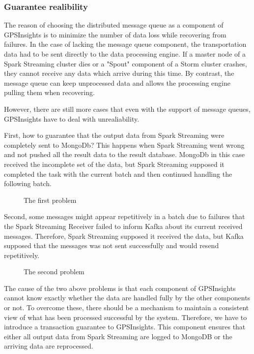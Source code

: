 \documentclass{acm_proc_article-sp}
\begin{document}
\subsubsection{Guarantee realibility}

The reason of choosing the distributed message queue as a component of GPSInsights is to minimize the number of data loss while recovering from failures. In the case of lacking the message queue component, the transportation data had to be sent directly to the data processing engine. If a master node of a Spark Streaming cluster dies or a "Spout" component of a Storm cluster crashes, they cannot receive any data which arrive during this time. By contrast, the message queue can keep unprocessed data and allows the processing engine pulling them when recovering.

However, there are still more cases that even with the support of message queues, GPSInsights have to deal with unrealiability. 

First, how to guarantee that the output data from Spark Streaming were completely sent to MongoDb? This happens when Spark Streaming went wrong and not pushed all the result data to the result database. MongoDb in this case received the incomplete set of the data, but Spark Streaming supposed it completed the task with the current batch and then continued handling the following batch.

\begin{figure}[!htb]
\centering
{}
\caption{The first problem}
\end{figure} 

Second, some messages might appear repetitively in a batch due to failures that the Spark Streaming Receiver failed to inform Kafka about its current received messages. Therefore, Spark Streaming supposed it received the data, but Kafka supposed that the messages was not sent successfully and would resend repetitively. 
 
\begin{figure}[!htb]
\centering
{}
\caption{The second problem}
\end{figure} 

The cause of the two above problems is that each component of GPSInsights cannot know exactly whether the data are handled fully by the other components or not. To overcome these, there should be a mechanism to maintain a consistent view of what has been processed successful by the system. Therefore, we have to introduce a transaction guarantee to GPSInsights. This component ensures that either all output data from Spark Streaming are logged to MongoDB or the arriving data are reprocessed.
\end{document}
